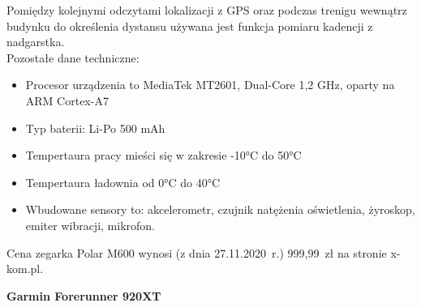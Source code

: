 \documentclass[a4paper,12pt,reqno]{article}
\begin{document}
Pomiędzy kolejnymi odczytami lokalizacji z GPS oraz podczas trenigu wewnątrz budynku do określenia dystansu używana jest funkcja pomiaru kadencji z nadgarstka.\\

Pozostałe dane techniczne:
\begin{itemize}
	\item Procesor urządzenia to MediaTek MT2601, Dual-Core 1,2 GHz, oparty na ARM Cortex-A7
	\item Typ baterii: Li-Po 500 mAh
	\item Tempertaura pracy mieści się w zakresie -10°C do 50°C
	\item Tempertaura ładownia od 0°C do 40°C
	\item Wbudowane sensory to: akcelerometr, czujnik natężenia oświetlenia, żyroskop, emiter wibracji, mikrofon.
\end{itemize}

Cena zegarka Polar M600 wynosi (z dnia 27.11.2020~r.) 999,99~zł na stronie x-kom.pl.
\vspace{1cm}
\begin{flushleft}
	\textbf{Garmin Forerunner 920XT}
\end{flushleft}
\end{document}

